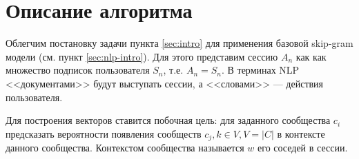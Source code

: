 \documentclass[times,specification,annotation]{itmo-student-thesis}
\begin{document}
\section{Описание алгоритма}\label{sec:algo}

Облегчим постановку задачи пункта \ref{sec:intro} для применения базовой skip-gram \cite{mikolov2013distributed} модели (см. пункт \ref{sec:nlp-intro}). Для этого представим сессию $A_n$ как как множество подписок пользователя $S_n$, т.е. $A_n = S_n$. В терминах NLP <<документами>> будут выступать сессии, а <<словами>> --- действия пользователя.

Для построения векторов ставится побочная цель: для заданного сообщества $c_i$ предсказать вероятности появления сообществ $c_j, k \in V, V = |C|$ в контексте данного сообщества. Контекстом сообщества называется $w$ его соседей в сессии. 
\end{document}
